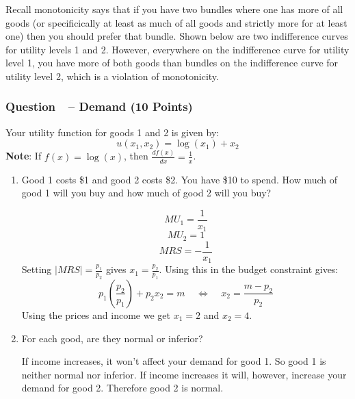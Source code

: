 \documentclass[12pt]{article}
\newcounter{question}[section]
\newcommand{\question}[1]{\refstepcounter{question}
  \subsubsection*{Question~\thequestion~-- #1}}
\newenvironment{subquestions}{
  \begin{enumerate}[label=(\roman*)]}{\end{enumerate}}
\begin{document}
\begin{itemize}
    \textcolor{solution-color}{
      Recall monotonicity says that if you have two bundles where one has more
      of all goods (or specificically at least as much of all goods and
      strictly more for at least one) then you should prefer that bundle. Shown
      below are two indifference curves for utility levels 1 and 2. However,
      everywhere on the indifference curve for utility level 1, you have
      more of both goods than bundles on the indifference curve for utility
      level 2, which is a violation of monotonicity.
    }
    \textcolor{solution-color}{
      \begin{center}
      \end{center}
    }
\end{itemize}
\question{Demand (10 Points)}
  Your utility function for goods 1 and 2 is given by:
  \[
    u\left( x_1,x_2 \right)= \log\left({x_1}\right) + x_2
  \]
\textbf{Note}: If $f\left( x \right)=\log\left( x \right)$, then
$\frac{df\left( x \right)}{dx}=\frac{1}{x}$.

\begin{subquestions}
  \item Good 1 costs \$1 and good 2 costs \$2. You have \$10 to
    spend.  How much of good 1 will you buy and how much of good 2 will you buy?

    \textcolor{solution-color}{
    \[
      MU_1 = \frac{1}{x_1}
    \]
    \[
      MU_2 = 1
    \]
    \[
      MRS = -\frac{1}{x_1}
    \]
    Setting $\left| MRS \right|=\frac{p_1}{p_2}$ gives $x_1=\frac{p_2}{p_1}$.
    Using this in the budget constraint gives:
    \[
      p_1\left( \frac{p_2}{p_1} \right)+p_2x_2 = m \;\;\;\;\Longleftrightarrow
      \;\;\;\;  x_2=\frac{m-p_2}{p_2}
    \]
    Using the prices and income we get $x_1=2$ and $x_2=4$.
  }
  \item For each good, are they normal or inferior?

    \textcolor{solution-color}{
      If income increases, it won't affect your demand for good 1. So good 1 is
      neither normal nor inferior. If income increases it will, however,
      increase your demand for good 2. Therefore good 2 is normal.
    }
\end{subquestions}
\end{document}
